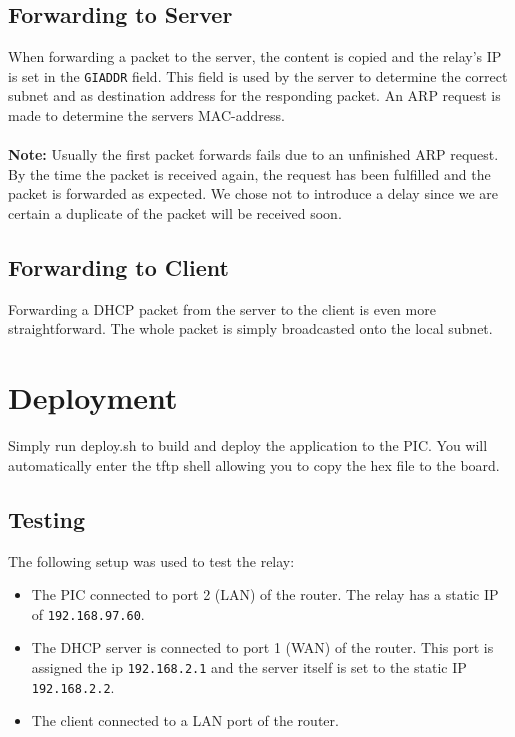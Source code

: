 \documentclass[11pt]{article}
\begin{document}
\subsection{Forwarding to Server}
When forwarding a packet to the server, the content is copied and the relay's IP
is set in the \texttt{GIADDR} field. This field is used by the server to
determine the correct subnet and as destination address for the responding
packet. An ARP request is made to determine the servers MAC-address.\\
\\
\textbf{Note:} Usually the first packet forwards fails due to an unfinished ARP request. By the time the packet is received again, the request has been fulfilled and the packet is forwarded as expected. We chose not to introduce a delay since we are certain a duplicate of the packet will be received soon.

\subsection{Forwarding to Client}
Forwarding a DHCP packet from the server to the client is even more
straightforward. The whole packet is simply broadcasted onto the local subnet.

\section{Deployment}
Simply run deploy.sh to build and deploy the application to the PIC. You will
automatically enter the tftp shell allowing you to copy the hex file to the
board.

\subsection{Testing}
The following setup was used to test the relay:

\begin{itemize}
	\item The PIC connected to port 2 (LAN) of the router. The relay has a static IP of \texttt{192.168.97.60}.
	\item The DHCP server is connected to port 1 (WAN) of the router. This port is assigned the ip \texttt{192.168.2.1} and the server itself is set to the static IP \texttt{192.168.2.2}.
	\item The client connected to a LAN port of the router.
\end{itemize}
\end{document}
